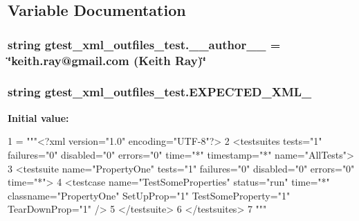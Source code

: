\subsection{Variable Documentation}
\hypertarget{namespacegtest__xml__outfiles__test_afbbd173129c3129e94bf58faebc4d525}{}
\subsubsection[{\+\_\+\+\_\+author\+\_\+\+\_\+}]{\setlength{\rightskip}{0pt plus 5cm}string gtest\+\_\+xml\+\_\+outfiles\+\_\+test.\+\_\+\+\_\+author\+\_\+\+\_\+ = \char`\"{}keith.\+ray@gmail.\+com (Keith Ray)\char`\"{}}\label{namespacegtest__xml__outfiles__test_afbbd173129c3129e94bf58faebc4d525}
\hypertarget{namespacegtest__xml__outfiles__test_a9d7b71e2d97dc7705cbe6e4882824c14}{}
\subsubsection[{E\+X\+P\+E\+C\+T\+E\+D\+\_\+\+X\+M\+L\+\_\+1}]{\setlength{\rightskip}{0pt plus 5cm}string gtest\+\_\+xml\+\_\+outfiles\+\_\+test.\+E\+X\+P\+E\+C\+T\+E\+D\+\_\+\+X\+M\+L\+\_}\label{namespacegtest__xml__outfiles__test_a9d7b71e2d97dc7705cbe6e4882824c14}
{\bfseries Initial value\+:}
\begin{DoxyCode}
1 = \textcolor{stringliteral}{"""<?xml version="1.0" encoding="UTF-8"?>}
2 \textcolor{stringliteral}{<testsuites tests="1" failures="0" disabled="0" errors="0" time="*" timestamp="*" name="AllTests">}
3 \textcolor{stringliteral}{  <testsuite name="PropertyOne" tests="1" failures="0" disabled="0" errors="0" time="*">}
4 \textcolor{stringliteral}{    <testcase name="TestSomeProperties" status="run" time="*" classname="PropertyOne" SetUpProp="1"
       TestSomeProperty="1" TearDownProp="1" />}
5 \textcolor{stringliteral}{  </testsuite>}
6 \textcolor{stringliteral}{</testsuites>}
7 \textcolor{stringliteral}{"""}
\end{DoxyCode}
\hypertarget{namespacegtest__xml__outfiles__test_a765455244a8cd7b3f32a51f0cda4157e}{}
